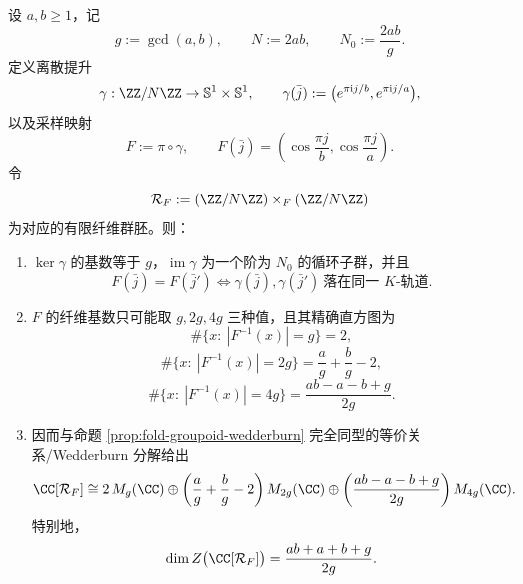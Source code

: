 \begin{proposition}\label{prop:derived-lissajous-discrete-klein-histogram-groupoid}
设 \(a,b\ge 1\)，记
\[
g:=\gcd(a,b),
\qquad
N:=2ab,
\qquad
N_0:=\frac{2ab}{g}.
\]
定义离散提升
\[
\gamma:\ZZ/N\ZZ\to\mathbb S^1\times\mathbb S^1,
\qquad
\gamma(\bar j):=\bigl(e^{\pi\mathrm i j/b},e^{\pi\mathrm i j/a}\bigr),
\]
以及采样映射
\[
F:=\pi\circ\gamma,
\qquad
F(\bar j)=\left(\cos\frac{\pi j}{b},\cos\frac{\pi j}{a}\right).
\]
令
\[
\mathcal R_F:=(\ZZ/N\ZZ)\times_{F}(\ZZ/N\ZZ)
\]
为对应的有限纤维群胚。则：
\begin{enumerate}
  \item \(\ker\gamma\) 的基数等于 \(g\)，\(\operatorname{im}\gamma\) 为一个阶为 \(N_0\) 的循环子群，并且
  \[
  F(\bar j)=F(\bar j')
  \iff
  \gamma(\bar j),\gamma(\bar j')\ \text{落在同一 }K\text{-轨道}.
  \]
  \item \(F\) 的纤维基数只可能取 \(g,2g,4g\) 三种值，且其精确直方图为
  \[
  \#\bigl\{x:\ |F^{-1}(x)|=g\bigr\}=2,
  \]
  \[
  \#\bigl\{x:\ |F^{-1}(x)|=2g\bigr\}=\frac{a}{g}+\frac{b}{g}-2,
  \]
  \[
  \#\bigl\{x:\ |F^{-1}(x)|=4g\bigr\}=\frac{ab-a-b+g}{2g}.
  \]
  \item 因而与命题 \ref{prop:fold-groupoid-wedderburn} 完全同型的等价关系/Wedderburn 分解给出
  \[
  \CC[\mathcal R_F]
  \cong
  2\,M_g(\CC)
  \oplus
  \left(\frac{a}{g}+\frac{b}{g}-2\right)M_{2g}(\CC)
  \oplus
  \left(\frac{ab-a-b+g}{2g}\right)M_{4g}(\CC).
  \]
  特别地，
  \[
  \dim Z\bigl(\CC[\mathcal R_F]\bigr)
  =\frac{ab+a+b+g}{2g}.
  \]
\end{enumerate}
\end{proposition}
